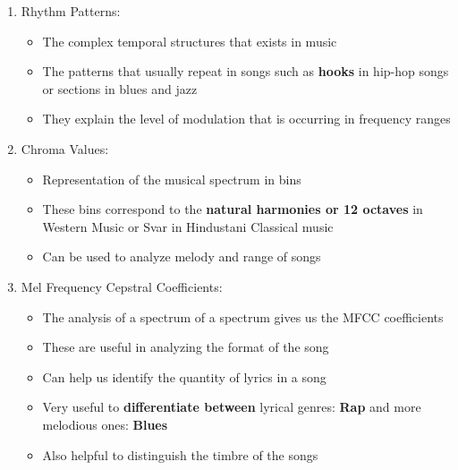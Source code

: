 \documentclass[11pt]{article}
\providecommand{\tightlist}{%
      \setlength{\itemsep}{0pt}\setlength{\parskip}{0pt}}
\begin{document}
\begin{enumerate}
\def\labelenumi{\arabic{enumi}.}
\tightlist
\item
  Rhythm Patterns:

  \begin{itemize}
  \tightlist
  \item
    The complex temporal structures that exists in music
  \item
    The patterns that usually repeat in songs such as \textbf{hooks} in
    hip-hop songs or sections in blues and jazz
  \item
    They explain the level of modulation that is occurring in frequency
    ranges
  \end{itemize}
\item
  Chroma Values:

  \begin{itemize}
  \tightlist
  \item
    Representation of the musical spectrum in bins
  \item
    These bins correspond to the \textbf{natural harmonies or 12
    octaves} in Western Music or Svar in Hindustani Classical music
  \item
    Can be used to analyze melody and range of songs
  \end{itemize}
\item
  Mel Frequency Cepstral Coefficients:

  \begin{itemize}
  \tightlist
  \item
    The analysis of a spectrum of a spectrum gives us the MFCC
    coefficients
  \item
    These are useful in analyzing the format of the song
  \item
    Can help us identify the quantity of lyrics in a song
  \item
    Very useful to \textbf{differentiate between} lyrical genres:
    \textbf{Rap} and more melodious ones: \textbf{Blues}
  \item
    Also helpful to distinguish the timbre of the songs
  \end{itemize}
\end{enumerate}
\end{document}
